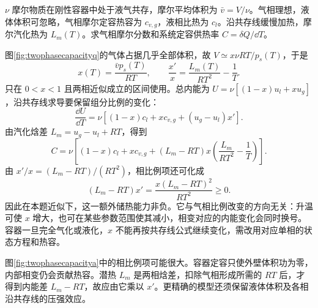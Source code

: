 \begin{example}[定容两相系统的表观热容]
$\nu$ 摩尔物质在刚性容器中处于液气共存，摩尔平均体积为 $\bar v=V/\nu$。气相理想，液体体积可忽略，气相摩尔定容热容为 $c_{v,g}$，液相比热为 $c_l$。沿共存线缓慢加热，摩尔汽化热为 $L_m(T)$。求气相摩尔分数和系统定容供热率 $C=\delta Q/\dd T$。
\end{example}
\begin{solution}
图\ref{fig:twophasecapacityq}的气体占据几乎全部体积，故 $V\simeq x\nu RT/p_s(T)$，于是
\[
 x(T)=\frac{\bar v p_s(T)}{RT},\qquad
 \frac{x'}x=\frac{L_m(T)}{RT^2}-\frac1T.
\]
只在 $0<x<1$ 且两相近似成立的区间使用。总内能为 $U=\nu[(1-x)u_l+xu_g]$，沿共存线求导要保留组分比例的变化：
\[
 \frac{\dd U}{\dd T}=\nu[(1-x)c_l+xc_{v,g}+(u_g-u_l)x'].
\]
由汽化焓差 $L_m=u_g-u_l+RT$，得到
\[
 C=\nu\left[(1-x)c_l+xc_{v,g}
 +(L_m-RT)x\left(\frac{L_m}{RT^2}-\frac1T\right)\right].
\]
由 $x'/x=(L_m-RT)/(RT^2)$，相比例项还可化成
\[
 (L_m-RT)x'=\frac{x(L_m-RT)^2}{RT^2}\ge0.
\]
因此在本题近似下，这一额外储热能力非负。它与气相比例改变的方向无关：升温可使 $x$ 增大，也可在某些参数范围使其减小，相变对应的内能变化会同时换号。容器一旦完全气化或液化，$x$ 不能再按共存线公式继续变化，需改用对应单相的状态方程和热容。

图\ref{fig:twophasecapacitya}中的相比例项可能很大。容器定容只使外壁体积功为零，内部相变仍会贡献热容。潜热 $L_m$ 是两相焓差，扣除气相形成所需的 $RT$ 后，才得到内能差 $L_m-RT$，故应由它乘以 $x'$。更精确的模型还须保留液体体积及各相沿共存线的压强效应。
\end{solution}

